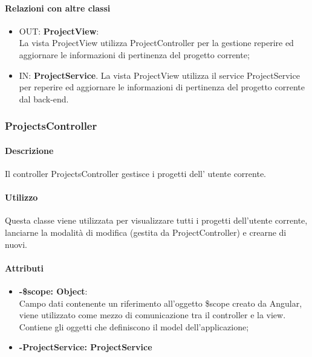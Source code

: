 	\paragraph{Relazioni con altre classi}
	\begin{itemize}
	  \item OUT: \textbf{ProjectView}:\\
		La vista ProjectView utilizza ProjectController per la gestione reperire ed aggiornare le informazioni di pertinenza del progetto corrente;	
	  \item IN: \textbf{ProjectService}.
		La vista ProjectView utilizza il service ProjectService per reperire ed aggiornare le informazioni di pertinenza del progetto corrente dal back-end.
	\end{itemize}
	
\subsubsection{ProjectsController}
	\paragraph{Descrizione}
	Il controller ProjectsController gestisce i progetti dell' utente corrente.
	
	\paragraph{Utilizzo}
	Questa classe viene utilizzata per visualizzare tutti i progetti dell'utente corrente, lanciarne la modalità di modifica (gestita da ProjectController) e crearne di nuovi.\\
	\paragraph{Attributi}
	\begin{itemize}
		\item \textbf{-\$scope: Object}:\\
			Campo dati contenente un riferimento all'oggetto \$scope creato da Angular, viene utilizzato come mezzo di comunicazione tra il controller e la view. Contiene gli oggetti che definiscono il model dell'applicazione;
		\item \textbf{-ProjectService: ProjectService}
	\end{itemize}
	
